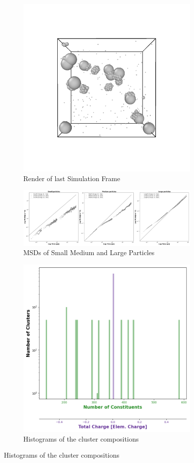 \documentclass[draft, english]{volcanica-template}
\begin{document}
\begin{figure}[!htbp]
\centering
\begin{figure}[!htbp]
\centering
\includegraphics[width=0.7\linewidth]{files/LastRender-59a2094d23a344fa815afea859df6404.png}
\caption[]{Render of last Simulation Frame}
\label{Fig5_SymTestSys}
\end{figure}

\begin{figure}[!htbp]
\centering
\includegraphics[width=0.7\linewidth]{files/Combined_MSD-75db98ec84fc2cc33d652fda3f757cc5.png}
\caption[]{MSDs of Small Medium and Large Particles}
\label{Fig5_NoQSymTestSys-b}
\end{figure}

\begin{figure}[!htbp]
\centering
\includegraphics[width=0.7\linewidth]{files/Cluster_Histogram_Fi-8776333a8cafab1d2ee7d240283fbb8e.png}
\caption[]{Histograms of the cluster compositions}
\label{Fig5_NoQSymTestSys-c}
\end{figure}


\end{figure}
\end{document}
